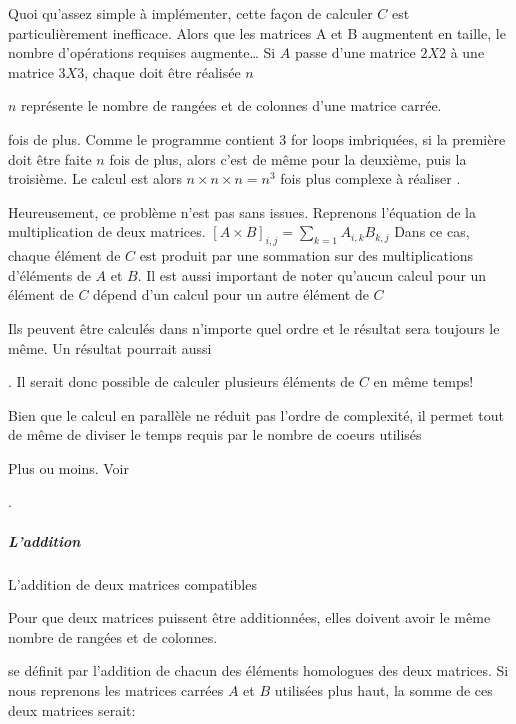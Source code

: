\documentclass[letterpaper,10pt,french]{sphinxmanual}
\begin{document}
Quoi qu’assez simple à implémenter, cette façon de calculer \(C\) est particulièrement inefficace. Alors que les matrices A et B augmentent en taille, le nombre d’opérations requises augmente… Si \(A\) passe d’une matrice \(2X2\) à une matrice \(3X3\), chaque  doit être réalisée \(n\)%
\begin{footnote}[21]\sphinxAtStartFootnote
\(n\) représente le nombre de rangées et de colonnes d’une matrice carrée.
%
\end{footnote} fois de plus. Comme le programme contient 3 for loops imbriquées, si la première doit être faite \(n\) fois de plus, alors c’est de même pour la deuxième, puis la troisième. Le calcul est alors \(n \times n \times n = n^3\) fois plus complexe à réaliser .

Heureusement, ce problème n’est pas sans issues. Reprenons l’équation de la multiplication de deux matrices.
\([A \times B]_{i,j} = \displaystyle\sum_{k=1}A_{i,k}B_{k,j}\)
Dans ce cas, chaque élément de \(C\) est produit par une sommation sur des multiplications d’éléments de \(A\) et \(B\). Il est aussi important de noter qu’aucun calcul pour un élément de \(C\) dépend d’un calcul pour un autre élément de \(C\)%
\begin{footnote}[22]\sphinxAtStartFootnote
Ils peuvent être calculés dans n’importe quel ordre et le résultat sera toujours le même. Un résultat pourrait aussi
%
\end{footnote}. Il serait donc possible de calculer plusieurs éléments de \(C\) en même temps!

Bien que le calcul en parallèle ne réduit pas l’ordre de complexité, il permet tout de même de diviser le temps requis par le nombre de coeurs utilisés%
\begin{footnote}[23]\sphinxAtStartFootnote
Plus ou moins. Voir 
%
\end{footnote}.


\subparagraph{L’addition}
\label{\detokenize{preprocessing:laddition}}
L’addition de deux matrices compatibles%
\begin{footnote}[24]\sphinxAtStartFootnote
Pour que deux matrices puissent être additionnées, elles doivent avoir le même nombre de rangées et de colonnes.
%
\end{footnote} se définit par l’addition de chacun des éléments homologues des deux matrices. Si nous reprenons les matrices carrées \(A\) et \(B\) utilisées plus haut, la somme de ces deux matrices serait:
\end{document}
